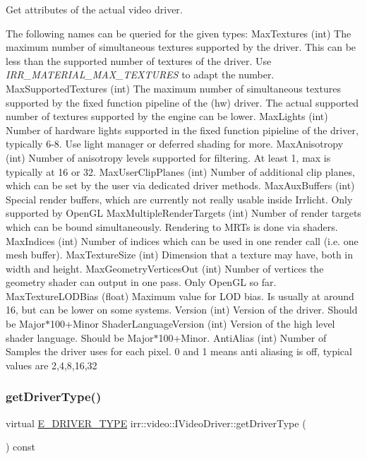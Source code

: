 Get attributes of the actual video driver. 

The following names can be queried for the given types\+: Max\+Textures (int) The maximum number of simultaneous textures supported by the driver. This can be less than the supported number of textures of the driver. Use {\itshape I\+R\+R\+\_\+\+M\+A\+T\+E\+R\+I\+A\+L\+\_\+\+M\+A\+X\+\_\+\+T\+E\+X\+T\+U\+R\+ES} to adapt the number. Max\+Supported\+Textures (int) The maximum number of simultaneous textures supported by the fixed function pipeline of the (hw) driver. The actual supported number of textures supported by the engine can be lower. Max\+Lights (int) Number of hardware lights supported in the fixed function pipieline of the driver, typically 6-\/8. Use light manager or deferred shading for more. Max\+Anisotropy (int) Number of anisotropy levels supported for filtering. At least 1, max is typically at 16 or 32. Max\+User\+Clip\+Planes (int) Number of additional clip planes, which can be set by the user via dedicated driver methods. Max\+Aux\+Buffers (int) Special render buffers, which are currently not really usable inside Irrlicht. Only supported by Open\+GL Max\+Multiple\+Render\+Targets (int) Number of render targets which can be bound simultaneously. Rendering to M\+R\+Ts is done via shaders. Max\+Indices (int) Number of indices which can be used in one render call (i.\+e. one mesh buffer). Max\+Texture\+Size (int) Dimension that a texture may have, both in width and height. Max\+Geometry\+Vertices\+Out (int) Number of vertices the geometry shader can output in one pass. Only Open\+GL so far. Max\+Texture\+L\+O\+D\+Bias (float) Maximum value for L\+OD bias. Is usually at around 16, but can be lower on some systems. Version (int) Version of the driver. Should be Major$\ast$100+\+Minor Shader\+Language\+Version (int) Version of the high level shader language. Should be Major$\ast$100+\+Minor. Anti\+Alias (int) Number of Samples the driver uses for each pixel. 0 and 1 means anti aliasing is off, typical values are 2,4,8,16,32 \mbox{\label{classirr_1_1video_1_1IVideoDriver_af89a0c4fcc0337f3befe8b90424e68aa}} 
\subsubsection{\texorpdfstring{get\+Driver\+Type()}{getDriverType()}}
{\footnotesize\ttfamily virtual \hyperlink{namespaceirr_1_1video_ae35a6de6d436c76107ad157fe42356d0}{E\+\_\+\+D\+R\+I\+V\+E\+R\+\_\+\+T\+Y\+PE} irr\+::video\+::\+I\+Video\+Driver\+::get\+Driver\+Type (\begin{DoxyParamCaption}{ }\end{DoxyParamCaption}) const\hspace{0.3cm}{\ttfamily [pure virtual]}}



